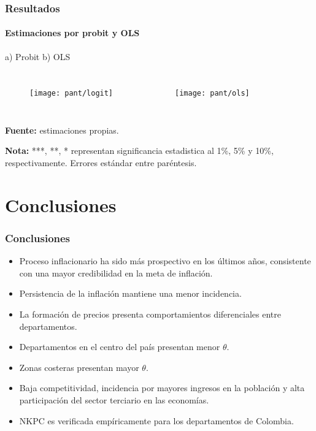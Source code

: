 \documentclass[10pt]{beamer}
\begin{document}
\begin{frame}
\frametitle{Resultados}
\framesubtitle{Estimaciones por probit y OLS}
a) Probit \hspace*{4cm} b) OLS
\begin{columns}[c]
\begin{figure}
\texttt{[image: pant/logit]}
\centering
\label{fig:ejemplo}
\end{figure} 
\begin{figure}
\texttt{[image: pant/ols]}
\centering
\label{fig:ejemplo}
\end{figure} 
\end{columns}
  \raggedright \tiny \textbf{Fuente:} estimaciones propias. \\
\raggedright  \tiny \textbf{Nota:} ***,  **, * representan significancia estadistica al 1\%, 5\% y 10\%, respectivamente. Errores estándar entre paréntesis.
\end{frame}



\section{Conclusiones}
\begin{frame}
\frametitle{Conclusiones}

\begin{itemize}[<i->]
\justifying
\item<1-> Proceso inflacionario ha sido más prospectivo en los últimos años, consistente con una mayor credibilidad en la meta de inflación.
\item<2->  Persistencia de la inflación mantiene una menor incidencia.
\item<3-> La formación de precios presenta comportamientos diferenciales entre departamentos.
\item<4-> Departamentos en el centro del país  presentan  menor $\theta$.
\item<5-> Zonas costeras  presentan  mayor $\theta$.
\item<6->  Baja competitividad, incidencia por mayores ingresos en la población  y alta participación del sector terciario en las economías.
\item<7-> NKPC es verificada empíricamente
para los departamentos de Colombia.
\end{itemize}
\end{frame}





\end{document}
